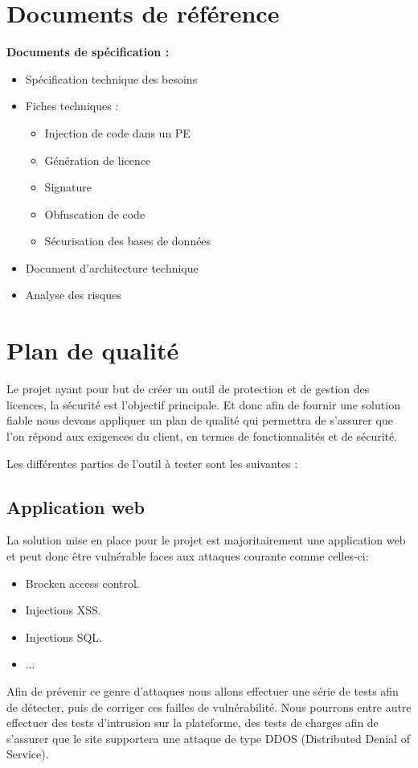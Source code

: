\chapter{Documents de référence}
\textbf{Documents de spécification :}
\begin{itemize}
    \item Spécification technique des besoins
    \item Fiches techniques :
    \begin{itemize}
        \item Injection de code dans un PE
        \item Génération de licence
        \item Signature
        \item Obfuscation de code
        \item Sécurisation des bases de données
    \end{itemize}
    \item Document d'architecture technique
    \item Analyse des risques
\end{itemize}


\chapter{Plan de qualité}

Le projet ayant pour but de créer un outil de protection et de gestion des licences, la sécurité
est l'objectif principale. Et donc afin de fournir une solution fiable nous devons appliquer un
plan de qualité qui permettra de s'assurer que l'on répond aux exigences du client, en termes de
fonctionnalités et de sécurité.

Les différentes parties de l'outil à tester sont les suivantes :
\section{Application web}
La solution mise en place pour le projet est majoritairement une application web et 
peut donc être vulnérable faces aux attaques courante comme celles-ci:
\begin{itemize}
    \item Brocken access control.
    \item Injections XSS.
    \item Injections SQL.
    \item ...
\end{itemize}
\medskip
Afin de prévenir ce genre d'attaques nous allons effectuer une série de tests afin de 
détecter, puis de corriger ces failles de vulnérabilité. Nous pourrons entre autre 
effectuer des tests d'intrusion sur la plateforme, des tests de charges afin de 
s'assurer que le site supportera une attaque de type DDOS (Distributed Denial of Service). 

